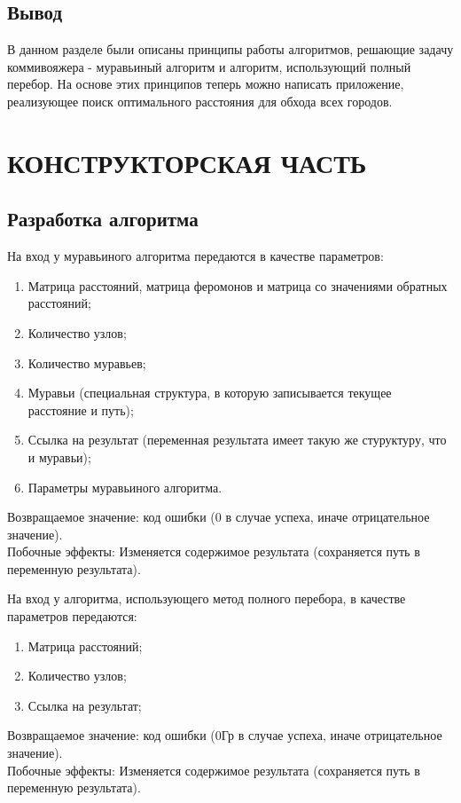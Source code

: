 \documentclass[a4paper,12pt]{article}
\begin{document}
\newpage
\subsection{Вывод}
В данном разделе были описаны принципы работы алгоритмов, решающие задачу коммивояжера - муравьиный алгоритм и алгоритм, использующий полный перебор. На основе этих принципов теперь можно написать приложение, реализующее поиск оптимального расстояния для обхода всех городов.


\newpage
\section{КОНСТРУКТОРСКАЯ ЧАСТЬ}

\subsection{Разработка алгоритма}
На вход у муравьиного алгоритма передаются в качестве параметров:
\begin{enumerate}
\item Матрица расстояний, матрица феромонов и матрица со значениями обратных расстояний;
\item Количество узлов;
\item Количество муравьев;
\item Муравьи (специальная структура, в которую записывается текущее расстояние и путь);
\item Ссылка на результат (переменная результата имеет такую же стуруктуру, что и муравьи);
\item Параметры муравьиного алгоритма.
\end{enumerate}
Возвращаемое значение: код ошибки (0 в случае успеха, иначе отрицательное значение). \\
Побочные эффекты:
Изменяется содержимое результата (сохраняется путь в переменную результата).

На вход у алгоритма, использующего метод полного перебора, в качестве параметров передаются:
\begin{enumerate}
\item Матрица расстояний;
\item Количество узлов;
\item Ссылка на результат;
\end{enumerate}
Возвращаемое значение: код ошибки (0Гр в случае успеха, иначе отрицательное значение). \\
Побочные эффекты:
Изменяется содержимое результата (сохраняется путь в переменную результата).
\end{document}
